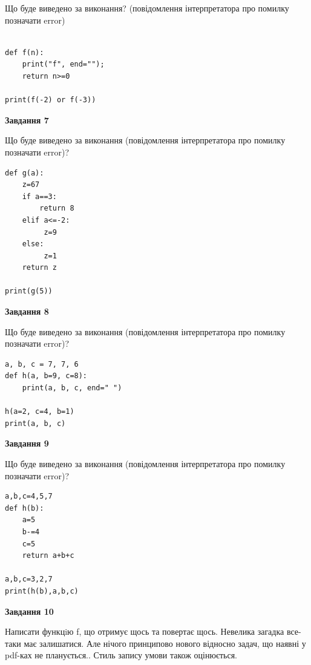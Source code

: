 \documentclass[12pt, ukrainian]{article}
\begin{document}
{\begin {large}
Що буде виведено за виконання? (повідомлення інтерпретатора про помилку позначати error)\par
\begin{verbatim}

def f(n):
    print("f", end="");
    return n>=0

print(f(-2) or f(-3))
\end{verbatim}

{\begin {center}\textbf{Завдання 7}\end {center}}

Що буде виведено за виконання (повідомлення інтерпретатора про помилку позначати error)?\par
\begin{verbatim}
def g(a):
    z=67
    if a==3: 
        return 8
    elif a<=-2:
         z=9
    else:
         z=1
    return z

print(g(5))
\end{verbatim}

{\begin {center}\textbf{Завдання 8}\end {center}}

Що буде виведено за виконання (повідомлення інтерпретатора про помилку позначати error)?\par
\begin{verbatim}
a, b, c = 7, 7, 6
def h(a, b=9, c=8):
    print(a, b, c, end=" ")

h(a=2, c=4, b=1)
print(a, b, c)
\end{verbatim}

{\begin {center}\textbf{Завдання 9}\end {center}}

Що буде виведено за виконання (повідомлення інтерпретатора про помилку позначати error)?\par
\begin{verbatim}
a,b,c=4,5,7
def h(b):
    a=5
    b-=4
    c=5
    return a+b+c

a,b,c=3,2,7
print(h(b),a,b,c)
\end{verbatim}

{\begin {center}\textbf{Завдання 10}\end {center}}


Написати функцiю f, що отримує щось та повертає щось. Невелика загадка все-таки має залишатися. Але нічого принципово нового відносно задач, що наявні у pdf-ках не планується.. Стиль запису умови також оцінюється.\par
\end {large}}
\newpage
\end{document}
